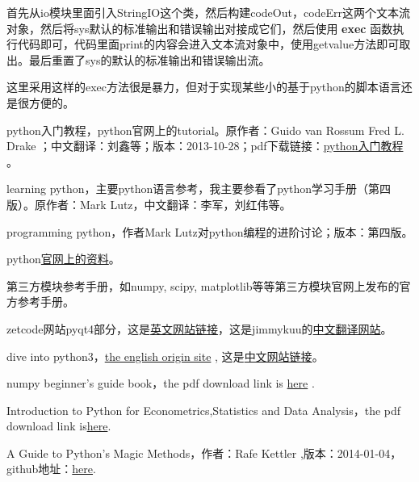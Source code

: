 \documentclass[12pt,oneside]{book}
\begin{document}
\begin{common-format}
首先从io模块里面引入StringIO这个类，然后构建codeOut，codeErr这两个文本流对象，然后将sys默认的标准输出和错误输出对接成它们，然后使用 \textbf{exec} 函数执行代码即可，代码里面print的内容会进入文本流对象中，使用getvalue方法即可取出。最后重置了sys的默认的标准输出和错误输出流。

这里采用这样的exec方法很是暴力，但对于实现某些小的基于python的脚本语言还是很方便的。



\begin{thebibliography}{9}
 python入门教程，python官网上的tutorial。原作者：Guido van Rossum  Fred L. Drake ；中文翻译：刘鑫等；版本：2013-10-28；pdf下载链接：\href{https://drive.google.com/open?id=0ByWxOeitx54PSW40bU5zNVhuMlU&authuser=0}{python入门教程}  。

 learning python，主要python语言参考，我主要参看了python学习手册（第四版）。原作者：Mark Lutz，中文翻译：李军，刘红伟等。

 programming python，作者Mark Lutz对python编程的进阶讨论；版本：第四版。

 python\href{https://docs.python.org/3/}{官网上的资料}。

 第三方模块参考手册，如numpy, scipy, matplotlib等等第三方模块官网上发布的官方参考手册。

 zetcode网站pyqt4部分，这是\href{http://zetcode.com/gui/pyqt4/}{英文网站链接}，这是jimmykuu的\href{http://blog.cx125.com/books/PyQt4_Tutorial/}{中文翻译网站}。

 dive into python3，\href{http://www.diveintopython3.net/index.html}{the english origin site} , 这是\href{http://sebug.net/paper/books/dive-into-python3/index.html}{中文网站链接}。

 numpy beginner's guide book，the pdf download link is \href{https://drive.google.com/open?id=0ByWxOeitx54PNXRIMUVybTlLZDQ&authuser=0}{here} . 

 Introduction to Python for Econometrics,Statistics and Data Analysis，the pdf download link is\href{https://drive.google.com/open?id=0ByWxOeitx54PTXN6RW5ydzQ4YXc&authuser=0}{here}.

 A Guide to Python's Magic Methods，作者：Rafe Kettler ,版本：2014-01-04，github地址：\href{https://github.com/RafeKettler/magicmethods}{here}.


\end{thebibliography}
\end{common-format}
\end{document}
